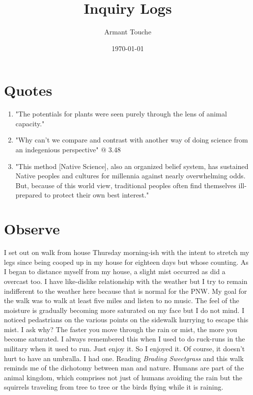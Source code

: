 \documentclass[a4paper,man,biblatex]{apa6}
\title{Inquiry Logs}
\author{Armant Touche}
\affiliation{Portland State University}
\date{\today}
\begin{document}

\section{Quotes}
\begin{enumerate}
    \item "The potentials for plants were seen purely through the lens of animal capacity."\autocite[19]{braiding}
    \item "Why can't we compare and contrast with another way of doing science from an indegenious perspective" @ 3.48 \autocite{twoeyes}
    \item "This method [Native Science], also an organized belief system, has sustained Native peoples and cultures for millennia against nearly overwhelming odds.  But, because of this world view, traditional peoples often find themselves ill-prepared to protect their own best interest." \autocite{westvsnative}
\end{enumerate}

\section{Observe}

        I set out on walk from house Thursday morning-ish with the intent to stretch my legs since being cooped up in my house for eighteen days but whose counting. As I began to distance myself from my house, a slight mist occurred as did a overcast too. I have like-dislike relationship with the weather but I try to remain indifferent to the weather here because that is normal for the PNW. My goal for the walk was to walk at least five miles and listen to no music. The feel of the moisture is gradually becoming more saturated on my face but I do not mind. I noticed pedastrians on the various points on the sidewalk hurrying to escape this mist. I ask why? The faster you move through the rain or mist, the more you become saturated. I always remembered this when I used to do ruck-runs in the military when it used to run. Just enjoy it. So I enjoyed it. Of course, it doesn't hurt to have an umbralla. I had one. Reading \textit{Brading Sweetgrass} and this walk reminds me of the dichotomy between man and nature. Humans are part of the animal kingdom, which comprises not just of humans avoiding the rain but the squirrels traveling from tree to tree or the birds flying while it is raining.  
\end{document}
